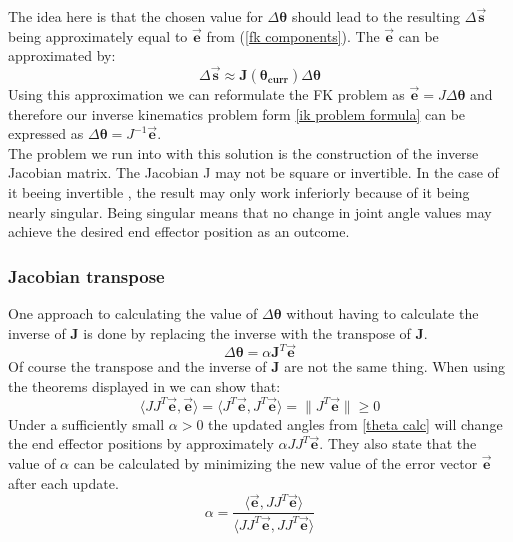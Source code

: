 The idea here is that the  chosen value for $\Delta\pmb{\theta}$ should lead to the resulting $\Delta\pmb{\vec{s}}$ being approximately equal to $\vec{\textbf{e}}$ from (\ref{fk components}). The $\vec{\textbf{e}}$ can be approximated by:
\begin{equation}
\label{delta s approx}
\Delta\pmb{\vec{s}}\approx \pmb{J(\theta_{curr})}\Delta\pmb{\theta}
\end{equation}
Using this approximation  we can reformulate the FK problem as $\pmb{}\vec{\pmb{e}}=J\Delta\pmb{\theta}$ and therefore our inverse kinematics problem form \ref{ik problem formula} can be expressed as $ \Delta\pmb{\theta}=J^{-1}\vec{\pmb{e}}$. \\The problem we run into with this solution is the construction of the inverse Jacobian matrix. The Jacobian J may not be square or invertible. In the case of it beeing invertible , the result may only work inferiorly because of it being nearly singular. Being singular means that no change in joint angle values may achieve the desired end effector position as an outcome.
\subsubsection{Jacobian transpose}
One approach to calculating the value of $\Delta\pmb{\theta}$ without having to calculate the inverse of \textbf{J} is done by replacing the inverse with the transpose of \textbf{J}.
\begin{equation}
\label{delta theta transpose}
\Delta\pmb{\theta}=\alpha \pmb{J}^{T}\vec{\pmb{e}}
\end{equation}
Of course the transpose and the inverse of \textbf{J} are not the same thing. When using the theorems displayed in \cite{DavidE.Orin.1984,Wolovich.1984} we can show that: 
\begin{equation}
\label{transpose show}
\langle JJ^{T}\vec{\pmb{e}},\vec{\pmb{e}}\rangle=\langle J^{T}\vec{\pmb{e}},J^{T}\vec{\pmb{e}}\rangle=\|J^{T}\vec{\pmb{e}}\|\geq 0
\end{equation}
Under a sufficiently small $\alpha>0$ the updated angles from \ref{theta calc} will change the end effector positions by approximately $\alpha JJ^{T}\vec{\pmb{e}}$. They also state that 
the value of $\alpha$ can be calculated by minimizing the new value of the error vector $\vec{\pmb{e}}$ after each update.
\begin{equation}
\label{transpose alpha}
\alpha=\frac{\langle\vec{\pmb{e}},JJ^{T}\vec{\pmb{e}}\rangle}{\langle JJ^{T}\vec{\pmb{e}},JJ^{T}\vec{\pmb{e}}\rangle}
\end{equation}
